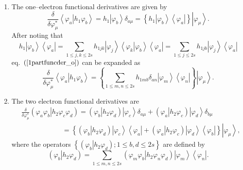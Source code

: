 \documentclass[aps,preprint]{revtex4}%
\begin{document}
\begin{enumerate}
\item The one--electron functional derivatives are given by
\begin{equation}
\frac{\delta}{\delta\varphi_{\mu}^{\ast}}\left\langle \left.  \varphi
_{a}\right\vert h_{1}\varphi_{b}\right\rangle =h_{1}\left\vert \varphi
_{b}\right\rangle \delta_{a\mu}=\left\{  h_{1}\left\vert \varphi
_{b}\right\rangle \left\langle \varphi_{a}\right\vert \right\}  \left\vert
\varphi_{\mu}\right\rangle . \label{1partfuncder_o}%
\end{equation}
After noting that
\begin{equation}
h_{1}\left\vert \varphi_{b}\right\rangle \left\langle \varphi_{a}\right\vert
=\sum_{1\leq j,k\leq2s}h_{1jk}\left\vert \varphi_{j}\right\rangle \left\langle
\left.  \varphi_{k}\right\vert \varphi_{b}\right\rangle \left\langle
\varphi_{a}\right\vert =\sum_{1\leq j\leq2s}h_{1jb}\left\vert \varphi
_{j}\right\rangle \left\langle \varphi_{a}\right\vert
\end{equation}
eq.\ $\left(  \ref{1partfuncder_o}\right)  $ can be expanded as
\begin{equation}
\frac{\delta}{\delta\varphi_{\mu}^{\ast}}\left\langle \left.  \varphi
_{a}\right\vert h_{1}\varphi_{b}\right\rangle =\left\{  \sum_{1\leq m,n\leq
2s}h_{1mb}\delta_{an}\left\vert \varphi_{m}\right\rangle \left\langle
\varphi_{n}\right\vert \right\}  \left\vert \varphi_{\mu}\right\rangle .
\label{1partfuncder_ex}%
\end{equation}


\item The two electron functional derivatives are
\begin{align}
&  \frac{\delta}{\delta\varphi_{\mu}^{\ast}}\left(  \left.  \varphi_{a}%
\varphi_{b}\right\vert h_{2}\varphi_{c}\varphi_{d}\right)  =\left(  \left.
\varphi_{b}\right\vert h_{2}\varphi_{d}\right)  \left\vert \varphi
_{c}\right\rangle \delta_{a\mu}+\left(  \left.  \varphi_{a}\right\vert
h_{2}\varphi_{c}\right)  \left\vert \varphi_{d}\right\rangle \delta_{b\mu
}\nonumber\\
&  \qquad\qquad\qquad\left.  =\right.  \left\{  \left(  \left.  \varphi
_{b}\right\vert h_{2}\varphi_{d}\right)  \left\vert \varphi_{c}\right\rangle
\left\langle \varphi_{a}\right\vert +\left(  \left.  \varphi_{a}\right\vert
h_{2}\varphi_{c}\right)  \left\vert \varphi_{d}\right\rangle \left\langle
\varphi_{b}\right\vert \right\}  \left\vert \varphi_{\mu}\right\rangle ,
\label{2partfuncder_o}%
\end{align}
where the operators $\left\{  \left(  \left.  \varphi_{b}\right\vert
h_{2}\varphi_{d}\right)  ;1\leq b,d\leq2s\right\}  $ are defined by
\begin{equation}
\left(  \left.  \varphi_{b}\right\vert h_{2}\varphi_{d}\right)  =\sum_{1\leq
m,n\leq2s}\left(  \left.  \varphi_{m}\varphi_{b}\right\vert h_{2}\varphi
_{n}\varphi_{d}\right)  \left\vert \varphi_{m}\right\rangle \left\langle
\varphi_{n}\right\vert .
\end{equation}

\end{enumerate}
\end{document}
